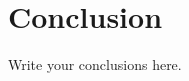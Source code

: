 \documentclass[]{IEEEtran}
\begin{document}
%



%



\section{Conclusion}
Write your conclusions here.

\end{document}
